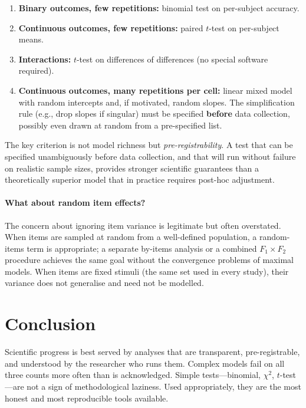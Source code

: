 \documentclass[11pt, a4paper]{article}
\begin{document}
\begin{enumerate}
  \item \textbf{Binary outcomes, few repetitions:}
        binomial test on per-subject accuracy.
  \item \textbf{Continuous outcomes, few repetitions:}
        paired \(t\)-test on per-subject means.
  \item \textbf{Interactions:}
        \(t\)-test on differences of differences (no special software
        required).
  \item \textbf{Continuous outcomes, many repetitions per cell:}
        linear mixed model with random intercepts and, if motivated,
        random slopes.  The simplification rule (e.g., drop slopes if
        singular) must be specified \textbf{before} data collection,
        possibly even drawn at random from a pre-specified list.
\end{enumerate}

The key criterion is not model richness but \emph{pre-registrability}.
A test that can be specified unambiguously before data collection, and
that will run without failure on realistic sample sizes, provides
stronger scientific guarantees than a theoretically superior model
that in practice requires post-hoc adjustment.

\paragraph{What about random item effects?}
The concern about ignoring item variance is legitimate but often
overstated.  When items are sampled at random from a well-defined
population, a random-items term is appropriate; a separate
by-items analysis \citep{clark1973language} or a combined
\(F_1 \times F_2\) procedure achieves the same goal without the
convergence problems of maximal models.  When items are fixed stimuli
(the same set used in every study), their variance does not generalise
and need not be modelled.

\section*{Conclusion}

Scientific progress is best served by analyses that are transparent,
pre-registrable, and understood by the researcher who runs them.
Complex models fail on all three counts more often than is acknowledged.
Simple tests---binomial, \(\chi^2\), \(t\)-test---are not a sign of
methodological laziness.  Used appropriately, they are the most honest
and most reproducible tools available.


\end{document}
